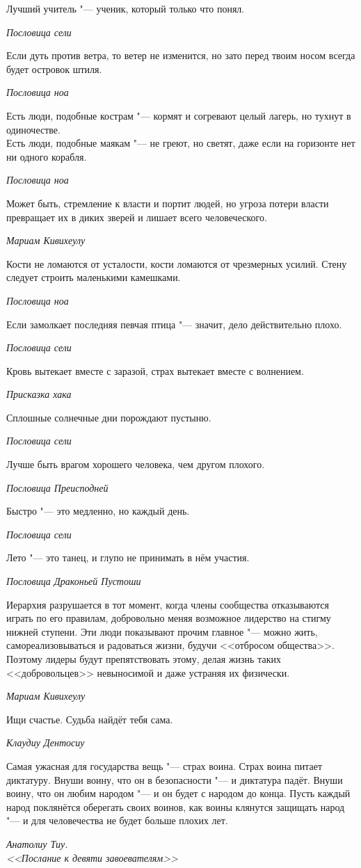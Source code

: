 \documentclass[a4paper,10pt]{book}
\begin{document}
\epigraph{Лучший учитель "--- ученик, который только что понял.}
{\textit{Пословица сели}}

\epigraph{Если дуть против ветра, то ветер не изменится, но зато перед твоим носом всегда будет островок штиля.}
{\textit{Пословица ноа}}

\epigraph{Есть люди, подобные кострам "--- кормят и согревают целый лагерь, но тухнут в одиночестве.\\
Есть люди, подобные маякам "--- не греют, но светят, даже если на горизонте нет ни одного корабля.}
{\textit{Пословица ноа}}

\epigraph{Может быть, стремление к власти и портит людей, но угроза потери власти превращает их в диких зверей и лишает всего человеческого.}
{\textit{Мариам Кивихеулу}}

\epigraph{Кости не ломаются от усталости, кости ломаются от чрезмерных усилий.
Стену следует строить маленькими камешками.}
{\textit{Пословица ноа}}

\epigraph{Если замолкает последняя певчая птица "--- значит, дело действительно плохо.}
{\textit{Пословица сели}}

\epigraph{Кровь вытекает вместе с заразой, страх вытекает вместе с волнением.}
{\textit{Присказка хака}}

\epigraph{Сплошные солнечные дни порождают пустыню.}
{\textit{Пословица сели}}

\epigraph{Лучше быть врагом хорошего человека, чем другом плохого.}
{\textit{Пословица Преисподней}}

\epigraph{Быстро "--- это медленно, но каждый день.}
{\textit{Пословица сели}}

\epigraph{Лето "--- это танец, и глупо не принимать в нём участия.}
{\textit{Пословица Драконьей Пустоши}}

\epigraph{Иерархия разрушается в тот момент, когда члены сообщества отказываются играть по его правилам, добровольно меняя возможное лидерство на стигму нижней ступени.
Эти люди показывают прочим главное "--- можно жить, самореализовываться и радоваться жизни, будучи <<отбросом общества>>.
Поэтому лидеры будут препятствовать этому, делая жизнь таких <<добровольцев>> невыносимой и даже устраняя их физически.}
{\textit{Мариам Кивихеулу}}

\epigraph{Ищи счастье.
Судьба найдёт тебя сама.}
{\textit{Клаудиу Дентосиу}}

\epigraph{Самая ужасная для государства вещь "--- страх воина.
Страх воина питает диктатуру.
Внуши воину, что он в безопасности "--- и диктатура падёт.
Внуши воину, что он любим народом "--- и он будет с народом до конца.
Пусть каждый народ поклянётся оберегать своих воинов, как воины клянутся защищать народ "--- и для человечества не будет больше плохих лет.}
{\textit{Анатолиу Тиу.\\<<Послание к девяти завоевателям>>}}
\end{document}

